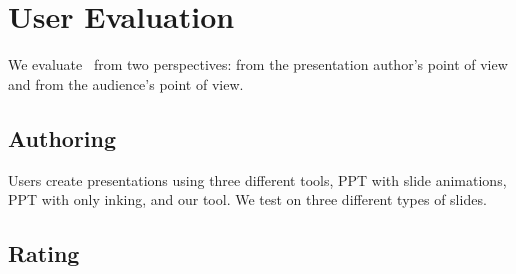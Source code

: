 \section{User Evaluation}

We evaluate \interface\ from two perspectives: from the presentation
author's point of view and from the audience's point of view. 


\subsection{Authoring}

Users create presentations using three different tools, PPT with slide animations, PPT with only inking, and our tool. We test on three different types of slides. 

\subsection{Rating}
